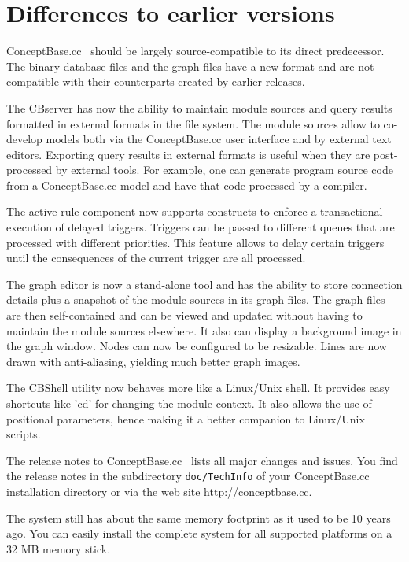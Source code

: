 \section{Differences to earlier versions}
\label{sec:differences}

ConceptBase.cc \relnr\ should be largely source-compatible to its direct predecessor.
The binary database files and the graph files have a new format and
are not compatible with their counterparts created by earlier releases.

The CBserver has now the ability to maintain module sources and
query results formatted in external formats in the file system. 
The module sources allow to co-develop models both via the ConceptBase.cc
user interface and by external text editors. Exporting query results in
external formats is useful when they are post-processed by external
tools. For example, one can generate program source code from 
a ConceptBase.cc model and have that code processed by a compiler.

The active rule component now supports constructs to enforce a
transactional execution of delayed triggers. Triggers can be passed to different queues
that are processed with different priorities. This feature allows to
delay certain triggers until the consequences of the current trigger are
all processed.

The graph editor is now a stand-alone tool and has the ability to store connection details
plus a snapshot of the module sources in its graph files. The graph files
are then self-contained and can be viewed and updated without having
to maintain the module sources elsewhere. It also can display a background
image in the graph window. Nodes can now be configured to be resizable.
Lines are now drawn with anti-aliasing, yielding much better graph images.

The CBShell utility now behaves more like a Linux/Unix shell. It provides
easy shortcuts like 'cd' for changing the module context. It also
allows the use of positional parameters, hence making it a better
companion to Linux/Unix scripts.

The release notes to ConceptBase.cc \relnr\ lists
all major changes and issues. You find the release notes in the subdirectory
{\tt doc/TechInfo} of your ConceptBase.cc installation directory or via
the web site \url{http://conceptbase.cc}.

The  system still has about the same memory footprint as it used to be 10 years ago. You can
easily install the complete system for all supported platforms on a 32 MB memory
stick.

